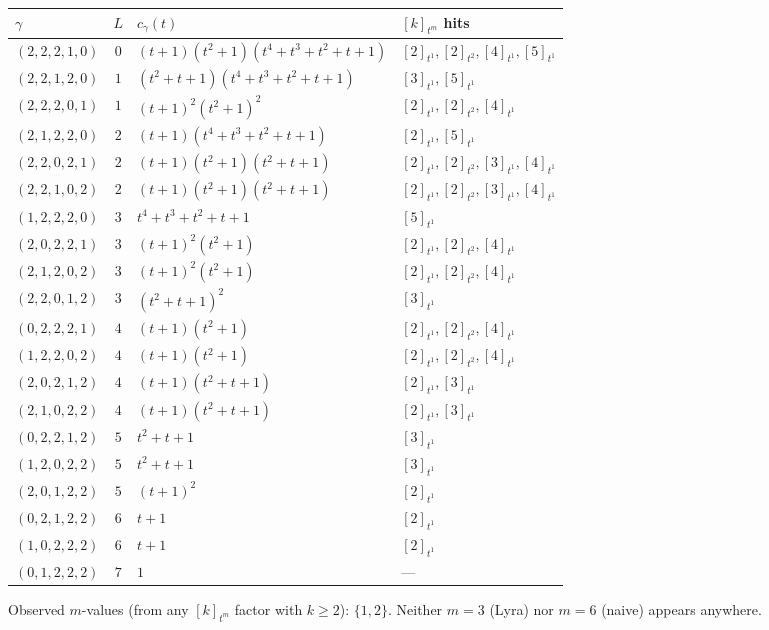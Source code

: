 \documentclass[11pt,letterpaper]{amsart}
\theoremstyle{definition}
\theoremstyle{remark}
\begin{document}
\begin{center}\small
\begin{tabular}{lcll}
$\gamma$ & $L$ & $c_\gamma(t)$ & $[k]_{t^m}$ hits \\ \hline
$(2,2,2,1,0)$ & $0$ & $(t+1)(t^2+1)(t^4+t^3+t^2+t+1)$ & $[2]_{t^1}, [2]_{t^2}, [4]_{t^1}, [5]_{t^1}$ \\
$(2,2,1,2,0)$ & $1$ & $(t^2+t+1)(t^4+t^3+t^2+t+1)$ & $[3]_{t^1}, [5]_{t^1}$ \\
$(2,2,2,0,1)$ & $1$ & $(t+1)^2 (t^2+1)^2$ & $[2]_{t^1}, [2]_{t^2}, [4]_{t^1}$ \\
$(2,1,2,2,0)$ & $2$ & $(t+1)(t^4+t^3+t^2+t+1)$ & $[2]_{t^1}, [5]_{t^1}$ \\
$(2,2,0,2,1)$ & $2$ & $(t+1)(t^2+1)(t^2+t+1)$ & $[2]_{t^1}, [2]_{t^2}, [3]_{t^1}, [4]_{t^1}$ \\
$(2,2,1,0,2)$ & $2$ & $(t+1)(t^2+1)(t^2+t+1)$ & $[2]_{t^1}, [2]_{t^2}, [3]_{t^1}, [4]_{t^1}$ \\
$(1,2,2,2,0)$ & $3$ & $t^4+t^3+t^2+t+1$ & $[5]_{t^1}$ \\
$(2,0,2,2,1)$ & $3$ & $(t+1)^2(t^2+1)$ & $[2]_{t^1}, [2]_{t^2}, [4]_{t^1}$ \\
$(2,1,2,0,2)$ & $3$ & $(t+1)^2(t^2+1)$ & $[2]_{t^1}, [2]_{t^2}, [4]_{t^1}$ \\
$(2,2,0,1,2)$ & $3$ & $(t^2+t+1)^2$ & $[3]_{t^1}$ \\
$(0,2,2,2,1)$ & $4$ & $(t+1)(t^2+1)$ & $[2]_{t^1}, [2]_{t^2}, [4]_{t^1}$ \\
$(1,2,2,0,2)$ & $4$ & $(t+1)(t^2+1)$ & $[2]_{t^1}, [2]_{t^2}, [4]_{t^1}$ \\
$(2,0,2,1,2)$ & $4$ & $(t+1)(t^2+t+1)$ & $[2]_{t^1}, [3]_{t^1}$ \\
$(2,1,0,2,2)$ & $4$ & $(t+1)(t^2+t+1)$ & $[2]_{t^1}, [3]_{t^1}$ \\
$(0,2,2,1,2)$ & $5$ & $t^2+t+1$ & $[3]_{t^1}$ \\
$(1,2,0,2,2)$ & $5$ & $t^2+t+1$ & $[3]_{t^1}$ \\
$(2,0,1,2,2)$ & $5$ & $(t+1)^2$ & $[2]_{t^1}$ \\
$(0,2,1,2,2)$ & $6$ & $t+1$ & $[2]_{t^1}$ \\
$(1,0,2,2,2)$ & $6$ & $t+1$ & $[2]_{t^1}$ \\
$(0,1,2,2,2)$ & $7$ & $1$ & --- \\
\end{tabular}
\end{center}

\medskip
Observed $m$-values (from any $[k]_{t^m}$ factor with $k \ge 2$): $\{1, 2\}$.
Neither $m = 3$ (Lyra) nor $m = 6$ (naive) appears anywhere.
\end{document}
